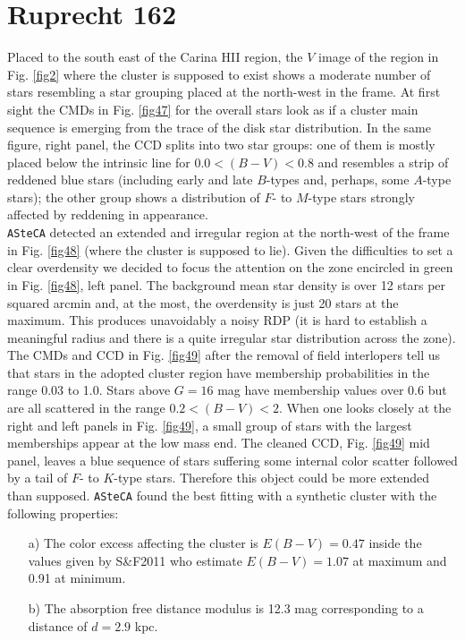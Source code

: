 \documentclass[draft]{aa}
\begin{document}
\section{Ruprecht 162}
\label{app:rup162}

Placed to the south east of the Carina HII region, the $V$ image of the region
in Fig. \ref{fig2} where the cluster is supposed to exist shows a moderate
number of stars resembling a star grouping placed at the north-west in the
frame. At first sight the CMDs in Fig. \ref{fig47} for the overall stars look
as if a cluster main sequence is emerging from the trace of the disk star
distribution.
In the same figure, right panel, the CCD splits into two star groups: one of
them is mostly placed below the intrinsic line for $0.0<(B-V)< 0.8$ and
resembles a strip of reddened blue stars (including early and late $B$-types
and, perhaps, some $A$-type stars); the other group shows a distribution of $F$-
to $M$-type stars strongly affected by reddening in appearance.\\

\texttt{ASteCA} detected an extended and irregular region at the north-west of
the frame in Fig. \ref{fig48} (where the cluster is supposed to lie). Given the
difficulties to set a clear overdensity we decided to focus the attention on the
zone encircled in green in Fig. \ref{fig48}, left panel. The background mean star
density is over 12 stars per squared arcmin and, at the most, the overdensity is
just 20 stars at the maximum. This produces unavoidably a noisy RDP (it is hard
to establish a meaningful radius and there is a quite irregular star
distribution across the zone).
%
The CMDs and CCD in Fig. \ref{fig49} after the removal of field interlopers tell
us that stars in the adopted cluster region have membership probabilities in the
range 0.03 to 1.0. Stars above $G=16$ mag have membership values over 0.6 but
are all scattered in the range $0.2<(B-V)<2$. When one looks closely at the
right and left panels in Fig. \ref{fig49}, a small group of stars with the
largest memberships appear at the low mass end.
The cleaned CCD, Fig. \ref{fig49} mid panel, leaves a blue sequence of stars
suffering some internal color scatter followed by a tail of $F$- to $K$-type
stars. Therefore this object could be more extended than supposed. 
\texttt{ASteCA} found the best fitting with a synthetic cluster with the
following properties:

\begin{itemize}
\item [a)] The color excess affecting the cluster is $E(B-V) =0.47$ inside
the values given by S\&F2011 who estimate $E(B-V) = 1.07$ at maximum and
0.91 at minimum. 
\item [b)] The absorption free distance modulus is 12.3 mag corresponding to a
distance of $d = 2.9$ kpc.
\end{itemize}
\end{document}

